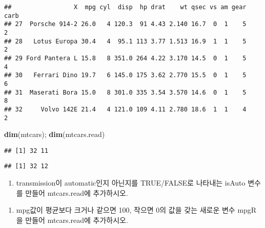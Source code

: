 \documentclass[]{article}
\newenvironment{Shaded}{\begin{snugshade}}{\end{snugshade}}
\newcommand{\KeywordTok}[1]{\textcolor[rgb]{0.13,0.29,0.53}{\textbf{#1}}}
\newcommand{\StringTok}[1]{\textcolor[rgb]{0.31,0.60,0.02}{#1}}
\newcommand{\CommentTok}[1]{\textcolor[rgb]{0.56,0.35,0.01}{\textit{#1}}}
\newcommand{\OtherTok}[1]{\textcolor[rgb]{0.56,0.35,0.01}{#1}}
\newcommand{\OperatorTok}[1]{\textcolor[rgb]{0.81,0.36,0.00}{\textbf{#1}}}
\newcommand{\NormalTok}[1]{#1}
\providecommand{\tightlist}{%
  \setlength{\itemsep}{0pt}\setlength{\parskip}{0pt}}
\begin{document}
\begin{verbatim}
##                 X  mpg cyl  disp  hp drat    wt qsec vs am gear carb
## 27  Porsche 914-2 26.0   4 120.3  91 4.43 2.140 16.7  0  1    5    2
## 28   Lotus Europa 30.4   4  95.1 113 3.77 1.513 16.9  1  1    5    2
## 29 Ford Pantera L 15.8   8 351.0 264 4.22 3.170 14.5  0  1    5    4
## 30   Ferrari Dino 19.7   6 145.0 175 3.62 2.770 15.5  0  1    5    6
## 31  Maserati Bora 15.0   8 301.0 335 3.54 3.570 14.6  0  1    5    8
## 32     Volvo 142E 21.4   4 121.0 109 4.11 2.780 18.6  1  1    4    2
\end{verbatim}

\begin{Shaded}
\begin{Highlighting}[]
\KeywordTok{dim}\NormalTok{(mtcars); }\KeywordTok{dim}\NormalTok{(mtcars.read)}
\end{Highlighting}
\end{Shaded}

\begin{verbatim}
## [1] 32 11
\end{verbatim}

\begin{verbatim}
## [1] 32 12
\end{verbatim}

\begin{enumerate}
\def\labelenumi{\arabic{enumi})}
\setcounter{enumi}{5}
\tightlist
\item
  transmission이 automatic인지 아닌지를 TRUE/FALSE로 나타내는 isAuto
  변수를 만들어 mtcars.read에 추가하시오.
\end{enumerate}

\begin{Shaded}
\end{Shaded}

\begin{enumerate}
\def\labelenumi{\arabic{enumi})}
\setcounter{enumi}{6}
\tightlist
\item
  mpg값이 평균보다 크거나 같으면 100, 작으면 0의 값을 갖는 새로운 변수
  mpgR을 만들어 mtcars.read에 추가하시오.
\end{enumerate}
\end{document}
